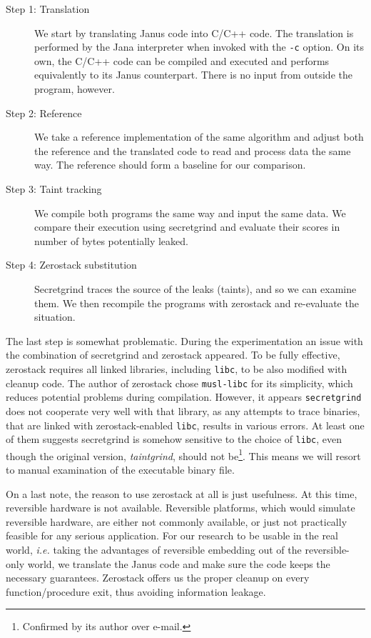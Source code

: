 \documentclass[a4paper,10pt,openright]{memoir}
\newcommand{\ie}{\emph{i.e.}\xspace}
\newcommand{\term}[1]{\textit{#1}}
\newcommand{\code}[1]{\texttt{#1}}
\begin{document}
\begin{description}

\item[Step 1: Translation] We start by translating Janus code into 
C/C++ code. The translation is performed by the Jana interpreter when 
invoked with the \code{-c} option. On its own, the C/C++ code can be 
compiled and executed and performs equivalently to its Janus 
counterpart. There is no input from outside the program, however.

\item[Step 2: Reference] We take a reference implementation of the same 
algorithm and adjust both the reference and the translated code to read 
and process data the same way. The reference should form a baseline for 
our comparison.

\item[Step 3: Taint tracking] We compile both programs the same way and 
input the same data. We compare their execution using 
secretgrind and evaluate their scores in number of bytes 
potentially leaked.

\item[Step 4: Zerostack substitution] Secretgrind traces the 
source of the leaks (taints), and so we can examine them. We then 
recompile the programs with zerostack and re-evaluate the 
situation.

\end{description}

The last step is somewhat problematic. During the experimentation an 
issue with the combination of secretgrind and zerostack 
appeared. To be fully effective, zerostack requires all linked 
libraries, including \code{libc}, to be also modified with cleanup 
code. The author of zerostack chose \code{musl-libc} for its 
simplicity, which reduces potential problems during compilation. 
However, it appears \code{secretgrind} does not cooperate very well 
with that library, as any attempts to trace binaries, that are linked 
with zerostack-enabled \code{libc}, results in various errors. 
At least one of them suggests secretgrind is somehow sensitive 
to the choice of \code{libc}, even though the original version, 
\term{taintgrind}, should not be\footnote{Confirmed by its author over 
e-mail.}. This means we will resort to manual examination of the 
executable binary file.

On a last note, the reason to use zerostack at all is just 
usefulness. At this time, reversible hardware is not available. 
Reversible platforms, which would simulate reversible hardware, are 
either not commonly available, or just not practically feasible for any 
serious application. For our research to be usable in the real world, 
\ie taking the advantages of reversible embedding out of the 
reversible-only world, we translate the Janus code and make sure the 
code keeps the necessary guarantees. Zerostack offers us the 
proper cleanup on every function/procedure exit, thus avoiding 
information leakage.
\end{document}
